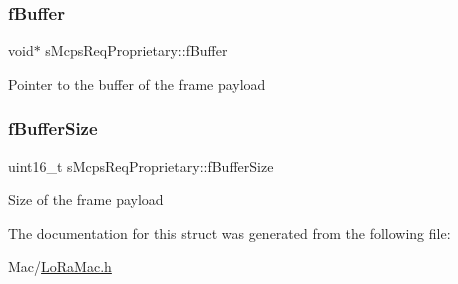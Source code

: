 \subsubsection{\texorpdfstring{f\+Buffer}{fBuffer}}
{\footnotesize\ttfamily void$\ast$ s\+Mcps\+Req\+Proprietary\+::f\+Buffer}

Pointer to the buffer of the frame payload \mbox{\label{structsMcpsReqProprietary_aa0da0ddb0d1d7e78d0c0ce1e51168d68}} 
\subsubsection{\texorpdfstring{f\+Buffer\+Size}{fBufferSize}}
{\footnotesize\ttfamily uint16\+\_\+t s\+Mcps\+Req\+Proprietary\+::f\+Buffer\+Size}

Size of the frame payload 

The documentation for this struct was generated from the following file\+:\begin{DoxyCompactItemize}
\item 
Mac/\hyperlink{LoRaMac_8h}{Lo\+Ra\+Mac.\+h}\end{DoxyCompactItemize}
